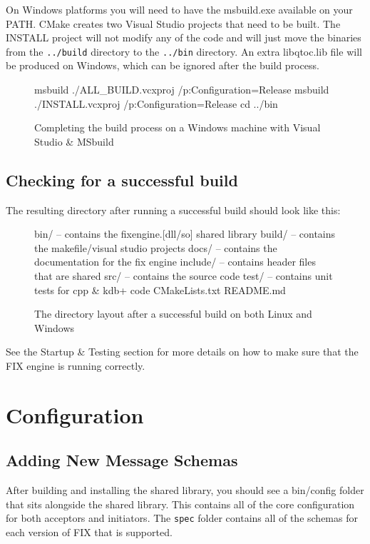 On Windows platforms you will need to have the msbuild.exe available on your PATH. CMake creates two Visual Studio projects that need to be built. The INSTALL project will not modify any of the code and will just move the binaries from the \verb|../build| directory to the \verb|../bin| directory. An extra libqtoc.lib file will be produced on Windows, which can be ignored after the build process.

\begin{figure}[H]
\begin{bashcode}
msbuild ./ALL_BUILD.vcxproj /p:Configuration=Release
msbuild ./INSTALL.vcxproj /p:Configuration=Release
cd ../bin
\end{bashcode}
\caption{Completing the build process on a Windows machine with Visual Studio \& MSbuild}
\end{figure}

\subsection{Checking for a successful build}
The resulting directory after running a successful build should look like this:

\begin{figure}[H]
\begin{bashcode}
bin/            -- contains the fixengine.[dll/so] shared library
build/          -- contains the makefile/visual studio projects
docs/           -- contains the documentation for the fix engine
include/        -- contains header files that are shared
src/            -- contains the source code
test/           -- contains unit tests for cpp \& kdb+ code
CMakeLists.txt  
README.md
\end{bashcode}
\caption{The directory layout after a successful build on both Linux and Windows}
\end{figure}

See the Startup \& Testing section for more details on how to make sure that the
FIX engine is running correctly.

\section{Configuration}
\subsection{Adding New Message Schemas}

After building and installing the shared library, you should see a bin/config folder that sits
alongside the shared library. This contains all of the core configuration for both acceptors
and initiators. The \verb|spec| folder contains all of the schemas for each version of FIX that is supported.

